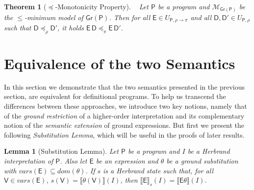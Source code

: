 \documentclass[submission,copyright]{eptcs}
\newtheorem{theorem}{Theorem}
\newtheorem{lemma}{Lemma}
\theoremstyle{definition}
\newcommand{\mwrt}[2]{\llbracket#1\rrbracket(#2)}
\newcommand{\mwrs}[3]{\llbracket#1\rrbracket_{#3}(#2)}
\newcommand{\bezem}{\mathcal{M}_\mathsf{Gr(P)}}
\begin{document}
\begin{theorem}[$\preceq$-Monotonicity Property]\label{th-preceq-monotonicity}~\cite{Bezem2002}
Let $\mathsf{P}$ be a program and $\bezem$ be the $\leq$-minimum model of $\mathsf{Gr(P)}$. Then for all $\mathsf{E} \in U_{\mathsf{P},\rho\rightarrow\pi}$ and all $\mathsf{D}, \mathsf{D}' \in U_{\mathsf{P},\rho}$ such that $\mathsf{D} \preceq_\rho \mathsf{D}'$, it holds $\mathsf{E} \, \mathsf{D} \preceq_{\pi} \mathsf{E} \, \mathsf{D}'$.
\end{theorem}

\section{Equivalence of the two Semantics}
\label{sec:positive}
\label{section4}
{In this section we demonstrate that the two semantics presented in the previous
section, are equivalent for definitional programs. To help us transcend the
differences between these approaches, we introduce two key notions, namely that
of the \emph{ground restriction} of a higher-order interpretation and its
complementary notion of the \emph{semantic extension} of ground expressions.
But first we present the following \emph{Substitution Lemma}, which will be useful in the proofs of later results.}
\begin{lemma}[Substitution Lemma]
\label{substitution_lemma}
Let $\mathsf{P}$ be a program and $I$ be a Herbrand interpretation of $\mathsf{P}$. Also
let $\mathsf{E}$ be an expression and $\theta$ be a ground
substitution with $vars(\mathsf{E}) \subseteq dom(\theta)$. If $s$ is a Herbrand state such that, for all
$\mathsf{V} \in vars(\mathsf{E})$, $s(\mathsf{V}) = \mwrt{\theta(\mathsf{V})}{I}$, then
$\mwrs{\mathsf{E}}{I}{s} = \mwrt{\mathsf{E}\theta}{I}$.
\end{lemma}
\end{document}
